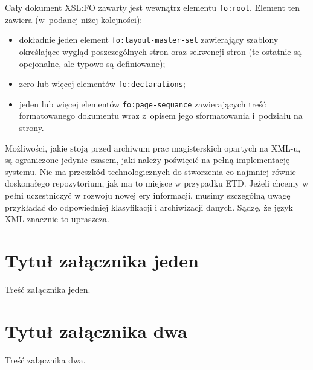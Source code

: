 \documentclass[document]{xmgr}
\begin{document}
Cały dokument XSL:FO zawarty jest wewnątrz elementu \texttt{fo:root}.
Element ten zawiera (w~podanej niżej kolejności):

\begin{itemize}
\item dokładnie jeden element \texttt{fo:layout-master-set} zawierający
  szablony określające wygląd poszczególnych stron oraz sekwencji
  stron (te ostatnie są opcjonalne, ale typowo są definiowane);
\item zero lub więcej elementów \texttt{fo:declarations};
\item jeden lub więcej elementów \texttt{fo:page-sequance}
 zawierających treść formatowanego dokumentu wraz z~opisem
 jego sformatowania i~podziału na strony.
\end{itemize}

\summary
Możliwości, jakie stoją przed archiwum prac magisterskich opartych na
XML-u, są ograniczone jedynie czasem, jaki należy poświęcić na pełną
implementację systemu. Nie ma przeszkód technologicznych do stworzenia
co najmniej równie doskonałego repozytorium, jak ma to miejsce w
przypadku ETD. Jeżeli chcemy w pełni uczestniczyć w rozwoju nowej ery
informacji, musimy szczególną uwagę przykładać do odpowiedniej
klasyfikacji i archiwizacji danych. Sądzę, że język XML znacznie to
upraszcza.

\appendix
\chapter{Tytuł załącznika jeden}

Treść załącznika jeden.

\chapter{Tytuł załącznika dwa}

Treść załącznika dwa.




\listoftables

\listoffigures

\oswiadczenie
\end{document}
